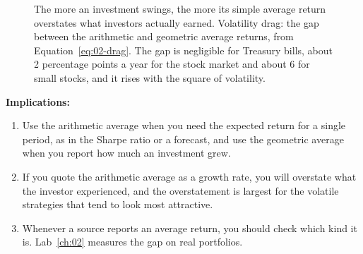 
\begin{figure}[!htbp]
  \centering
  \caption{The more an investment swings, the more its simple average return overstates what investors actually earned. Volatility drag: the gap between the arithmetic and geometric average returns, from Equation~\eqref{eq:02-drag}. The gap is negligible for Treasury bills, about 2 percentage points a year for the stock market and about 6 for small stocks, and it rises with the square of volatility.}
  \label{fig:02-drag}
\end{figure}

\textbf{Implications:}
\begin{enumerate}
\item Use the arithmetic average when you need the expected return for a single period, as in the Sharpe ratio or a forecast, and use the geometric average when you report how much an investment grew. 
\item If you quote the arithmetic average as a growth rate, you will overstate what the investor experienced, and the overstatement is largest for the volatile strategies that tend to look most attractive. 
\item Whenever a source reports an average return, you should check which kind it is. Lab~\ref{ch:02} measures the gap on real portfolios.
\end{enumerate}

